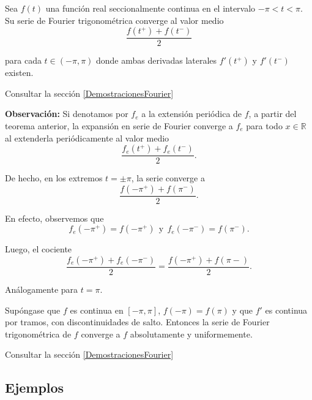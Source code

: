 \begin{teorema} \label{Puntual}
Sea $f(t)$ una función real seccionalmente continua en el intervalo $-\pi < t < \pi$. Su serie de Fourier trigonométrica converge al valor medio
\vspace{-0.05cm}
$$\frac{f(t^+) + f(t^-)}{2}$$

para cada $t \in (-\pi,\pi)$ donde ambas derivadas laterales $f'(t^+)$ y $f'(t^-)$ existen.
\end{teorema}

\begin{demo}
    Consultar la sección \ref{DemostracionesFourier}
\end{demo}

\textbf{Observación:} Si denotamos por $f_e$ a la extensión periódica de $f$, a partir del teorema anterior, la expansión en serie de Fourier converge a $f_e$ para todo $x \in \mathbb{R}$ al extenderla periódicamente al valor medio
$$\frac{f_e(t^+) + f_e(t^-)}{2}.$$

De hecho, en los extremos $t = \pm \pi$, la serie converge a 
$$\frac{f(-\pi^+) + f(\pi^-)}{2}.$$

En efecto, observemos que
$$f_e(-\pi^+) = f(-\pi^+) ~~\mbox{y}~~ f_e(-\pi^-) = f(\pi^-).$$

Luego, el cociente
$$\frac{f_e(-\pi^+) + f_e(-\pi^-)}{2} = \frac{f(-\pi^+) + f(\pi-)}{2}.$$

Análogamente para $t = \pi$.

\begin{teorema} \label{C.Uniforme}
Supóngase que $f$ es continua en $[-\pi,\pi]$, $f(-\pi) = f(\pi)$ y que $f'$ es continua por tramos, con discontinuidades de salto. Entonces la serie de Fourier trigonométrica de $f$ converge a $f$ absolutamente y uniformemente.
\end{teorema}

\begin{demo}
    Consultar la sección \ref{DemostracionesFourier}
\end{demo}

\subsection{Ejemplos}

